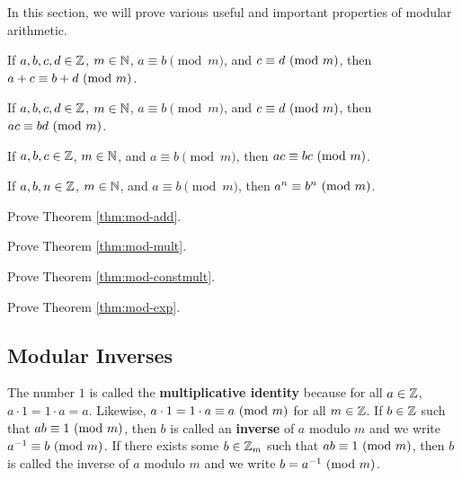 In this section, we will prove various useful and important properties of modular arithmetic.

\begin{theorem}
\label{thm:mod-add}
If $a, b, c, d\in \mathbb{Z}$, $m \in \mathbb{N}$, $a\equiv b \pmod{m}$, and $c \equiv d\mbox{\ $\left(\mathrm{mod}\ {m}\right)$}$, then $a+c \equiv b+d \mbox{\ $\left(\mathrm{mod}\ {m}\right)$}$.
\end{theorem}

\begin{theorem}
\label{thm:mod-mult}
If $a, b, c, d\in \mathbb{Z}$, $m \in \mathbb{N}$, $a\equiv b \pmod{m}$, and $c \equiv d\mbox{\ $\left(\mathrm{mod}\ {m}\right)$}$, then $ac \equiv bd \mbox{\ $\left(\mathrm{mod}\ {m}\right)$}$.
\end{theorem}

\begin{theorem}
\label{thm:mod-constmult}
If $a, b, c\in \mathbb{Z}$, $m \in \mathbb{N}$, and $a\equiv b \pmod{m}$, then $ac \equiv bc \mbox{\ $\left(\mathrm{mod}\ {m}\right)$}$.
\end{theorem}

\begin{theorem}
\label{thm:mod-exp}
If $a, b, n\in \mathbb{Z}$, $m \in \mathbb{N}$, and $a\equiv b \pmod{m}$, then $a^n \equiv b^n \mbox{\ $\left(\mathrm{mod}\ {m}\right)$}$.
\end{theorem}

\begin{problem} [10 points]
Prove Theorem \ref{thm:mod-add}.
\end{problem}

\begin{problem} [10 points]
Prove Theorem \ref{thm:mod-mult}.
\end{problem}

\begin{problem} [10 points]
Prove Theorem \ref{thm:mod-constmult}.
\end{problem}

\begin{problem} [10 points]
Prove Theorem \ref{thm:mod-exp}.
\end{problem}

	\subsection{Modular Inverses}

\begin{definition}
The number $1$ is called the {\bf multiplicative identity} because for all $a\in\mathbb{Z}$, $a\cdot 1 = 1\cdot a = a$. Likewise,  $a\cdot 1 = 1\cdot a \equiv a \mbox{\ $\left(\mathrm{mod}\ {m}\right)$}$ for all $m\in\mathbb{Z}$. If $b\in\mathbb{Z}$ such that $ab \equiv 1\mbox{\ $\left(\mathrm{mod}\ {m}\right)$}$, then $b$ is called an {\bf inverse}  of $a$ modulo $m$ and we write $a^{-1}\equiv b \mbox{\ $\left(\mathrm{mod}\ {m}\right)$}$. If there exists some $b\in\mathbb{Z}_m$ such that $ab\equiv 1\mbox{\ $\left(\mathrm{mod}\ {m}\right)$}$, then $b$ is called the inverse of $a$ modulo $m$ and we write $b = a^{-1}\mbox{\ $\left(\mathrm{mod}\ {m}\right)$}$.
\end{definition}

